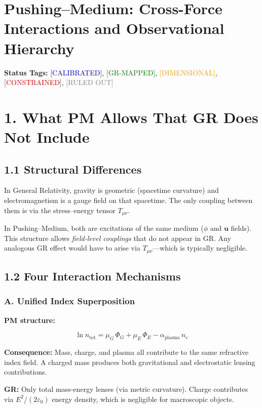\documentclass{article}
\begin{document}
\section*{Pushing--Medium: Cross-Force Interactions and Observational Hierarchy}

\textbf{Status Tags:}
\textcolor{blue}{[CALIBRATED]}, \textcolor{green}{[GR-MAPPED]}, \textcolor{orange}{[DIMENSIONAL]}, \textcolor{red}{[CONSTRAINED]}, \textcolor{gray}{[RULED OUT]}

\section*{1. What PM Allows That GR Does Not Include}

\subsection*{1.1 Structural Differences}

In General Relativity, gravity is geometric (spacetime curvature) and
electromagnetism is a gauge field on that spacetime. The only coupling between
them is via the stress--energy tensor $T_{\mu\nu}$.

In Pushing--Medium, both are excitations of the same medium ($\phi$ and
$\mathbf u$ fields). This structure allows \emph{field-level couplings} that do
not appear in GR. Any analogous GR effect would have to arise via
$T_{\mu\nu}$—which is typically negligible.

\subsection*{1.2 Four Interaction Mechanisms}

\subsubsection*{A. Unified Index Superposition}

\textbf{PM structure:}



\[
\ln n_{\text{tot}} = \mu_G\,\Phi_G + \mu_E\,\Phi_E - \alpha_{\text{plasma}}\,n_e
\]



\textbf{Consequence:} Mass, charge, and plasma all contribute to the same
refractive index field. A charged mass produces both gravitational and
electrostatic lensing contributions.

\textbf{GR:} Only total mass-energy lenses (via metric curvature). Charge
contributes via $E^2/(2\varepsilon_0)$ energy density, which is negligible for
macroscopic objects.
\end{document}
